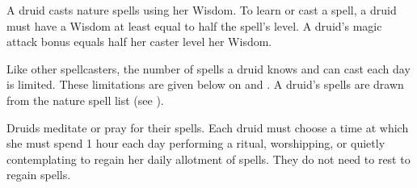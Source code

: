  A druid casts nature spells using her Wisdom. To learn or cast a spell, a druid must have a Wisdom at least equal to half the spell's level. A druid's magic attack bonus equals half her caster level \add her Wisdom.

Like other spellcasters, the number of spells a druid knows and can cast each day is limited. These limitations are given below on  and . A druid's spells are drawn from the nature spell list (see ).

Druids meditate or pray for their spells. Each druid must choose a time at which she must spend 1 hour each day performing a ritual, worshipping, or quietly contemplating to regain her daily allotment of spells. They do not need to rest to regain spells.

